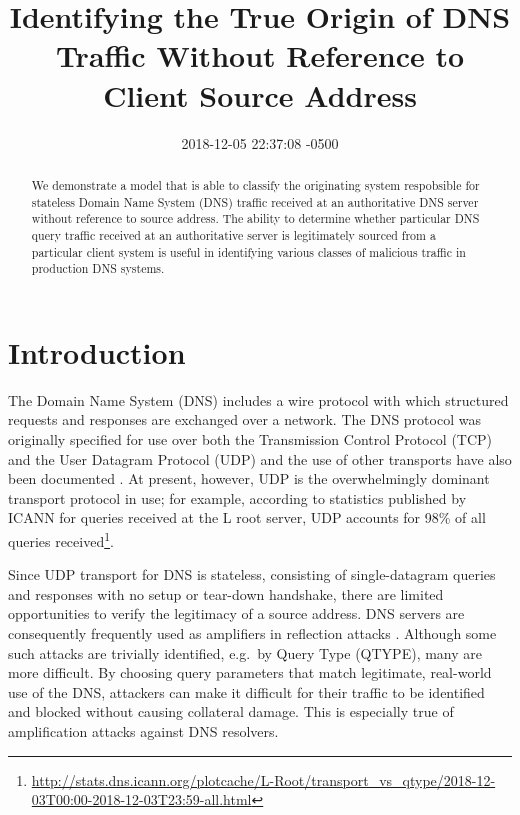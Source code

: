 \documentclass[conference]{IEEEtran}
\title{Identifying the True Origin of DNS Traffic Without Reference to Client
Source Address}
\author{\IEEEauthorblockN{Joe Abley}\IEEEauthorblockA{Western University, London, Ontario, Canada \\ Afilias Canada, Toronto, Ontario, Canada \\ \href{mailto:jabley@uwo.ca}{\nolinkurl{jabley@uwo.ca}},
\href{mailto:jabley@afilias.info}{\nolinkurl{jabley@afilias.info}}}}
\date{2018-12-05 22:37:08 -0500}
\let\citep\cite
\begin{document}
\maketitle
\begin{abstract}
We demonstrate a model that is able to classify the originating system
respobsible for stateless Domain Name System (DNS) traffic received at
an authoritative DNS server without reference to source address. The
ability to determine whether particular DNS query traffic received at an
authoritative server is legitimately sourced from a particular client
system is useful in identifying various classes of malicious traffic in
production DNS systems.
\end{abstract}

\section{Introduction}\label{sec:introduction}

\label{sec:introduction}

The Domain Name System (DNS) includes a wire protocol with which
structured requests and responses are exchanged over a network. The DNS
protocol was originally specified \citep{rfc1034}\citep{rfc1035} for use
over both the Transmission Control Protocol (TCP) \citep{rfc793} and the
User Datagram Protocol (UDP) \citep{rfc768} and the use of other
transports have also been documented
\citep{rfc7858}\citep{rfc8484}\citep{huitema-quic-dnsoquic-05}. At
present, however, UDP is the overwhelmingly dominant transport protocol
in use; for example, according to statistics published by ICANN for
queries received at the L root server, UDP accounts for 98\% of all
queries
received\footnote{\url{http://stats.dns.icann.org/plotcache/L-Root/transport_vs_qtype/2018-12-03T00:00-2018-12-03T23:59-all.html}}.

Since UDP transport for DNS is stateless, consisting of single-datagram
queries and responses with no setup or tear-down handshake, there are
limited opportunities to verify the legitimacy of a source address. DNS
servers are consequently frequently used as amplifiers in reflection
attacks \citep{rfc5358}. Although some such attacks are trivially
identified, e.g.~by Query Type (QTYPE), many are more difficult. By
choosing query parameters that match legitimate, real-world use of the
DNS, attackers can make it difficult for their traffic to be identified
and blocked without causing collateral damage. This is especially true
of amplification attacks against DNS resolvers.
\end{document}
